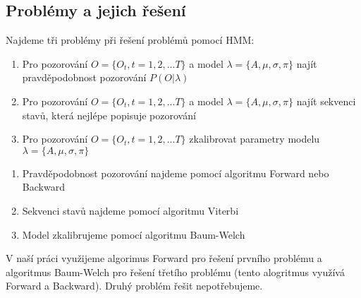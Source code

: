 \subsection{Problémy a jejich řešení}
Najdeme tři problémy při řešení problémů pomocí HMM:
\begin{enumerate}
    \item Pro pozorování \(O = \{O_t,t=1,2,...T\}\) a model \(\lambda = \{A,\mu,\sigma,\pi\}\) najít pravděpodobnost pozorování \(P(O|\lambda)\)
    \item Pro pozorování \(O = \{O_t,t=1,2,...T\}\) a model \(\lambda = \{A,\mu,\sigma,\pi\}\)
    najít sekvenci stavů, která nejlépe popisuje pozorování
    \item Pro pozorování \(O = \{O_t,t=1,2,...T\}\) zkalibrovat parametry modelu \(\lambda = \{A,\mu,\sigma,\pi\}\)
\end{enumerate}
\begin{enumerate}
    \item Pravděpodobnost pozorování najdeme pomocí algoritmu Forward nebo Backward
    \item Sekvenci stavů najdeme pomocí algoritmu Viterbi
    \item Model zkalibrujeme pomocí algoritmu Baum-Welch
\end{enumerate}

V naší práci využijeme algorimus Forward pro řešení prvního problému a algoritmus Baum-Welch pro řešení třetího problému (tento alogritmus využívá Forward a Backward). Druhý problém řešit nepotřebujeme.

\clearpage
